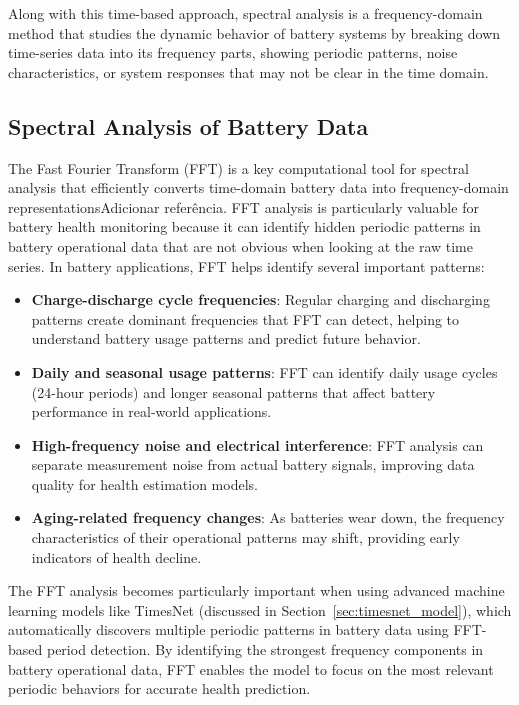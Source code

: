Along with this time-based approach, spectral analysis is a frequency-domain method that studies the dynamic behavior of battery systems by breaking down time-series data into its frequency parts, showing periodic patterns, noise characteristics, or system responses that may not be clear in the time domain. 

\subsection{Spectral Analysis of Battery Data}

The Fast Fourier Transform (FFT) is a key computational tool for spectral analysis that efficiently converts time-domain battery data into frequency-domain representations\color{Red}Adicionar referência\color{Black}. FFT analysis is particularly valuable for battery health monitoring because it can identify hidden periodic patterns in battery operational data that are not obvious when looking at the raw time series. In battery applications, FFT helps identify several important patterns:

\begin{itemize}
\item \textbf{Charge-discharge cycle frequencies}: Regular charging and discharging patterns create dominant frequencies that FFT can detect, helping to understand battery usage patterns and predict future behavior.
\item \textbf{Daily and seasonal usage patterns}: FFT can identify daily usage cycles (24-hour periods) and longer seasonal patterns that affect battery performance in real-world applications.
\item \textbf{High-frequency noise and electrical interference}: FFT analysis can separate measurement noise from actual battery signals, improving data quality for health estimation models.
\item \textbf{Aging-related frequency changes}: As batteries wear down, the frequency characteristics of their operational patterns may shift, providing early indicators of health decline.
\end{itemize}


The FFT analysis becomes particularly important when using advanced machine learning models like TimesNet (discussed in Section~\ref{sec:timesnet_model}), which automatically discovers multiple periodic patterns in battery data using FFT-based period detection. By identifying the strongest frequency components in battery operational data, FFT enables the model to focus on the most relevant periodic behaviors for accurate health prediction.

